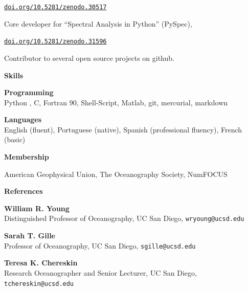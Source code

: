 \documentclass[a4paper,11pt,final]{memoir}
\newcommand{\Sep}{\vspace{1.25em}}
\newcommand{\SmallSep}{\vspace{0.5em}}
\newcommand{\CVSection}[1]
    {\Large\textbf{#1}\par
    \SmallSep\normalsize\normalfont}
\newcommand{\CVItem}[1]
    {\textbf{\color{NavyBlue} #1}}
\begin{document}
\href{http://dx.doi.org/10.5281/zenodo.30517}{\texttt{doi.org/10.5281/zenodo.30517}}

\SmallSep

Core developer for ``Spectral Analysis in Python'' (PySpec),

\SmallSep

\href{http://dx.doi.org/10.5281/zenodo.31596}{\texttt{doi.org/10.5281/zenodo.31596}}

\SmallSep

Contributor to several open source projects on github.

\Sep


\Sep

\CVSection{Skills}

\CVItem{Programming}\\
Python , C, Fortran 90, Shell-Script, Matlab, git, mercurial, markdown

\SmallSep

\CVItem{Languages}\\
English (fluent), Portuguese (native), Spanish (professional fluency), French (basic)

\Sep

\CVSection{Membership}

 American Geophysical Union, The Oceanography Society, NumFOCUS

\Sep

%

\Sep

\CVSection{References}

\CVItem{William R. Young}\\
Distinguished Professor of Oceanography, UC San Diego, \texttt{wryoung@ucsd.edu}

\SmallSep

\CVItem{Sarah T. Gille}\\
Professor of Oceanography, UC San Diego, \texttt{sgille@ucsd.edu}

\SmallSep

\CVItem{Teresa K. Chereskin}\\
Research Oceanographer and Senior Lecturer, UC San Diego, \texttt{tchereskin@ucsd.edu}

\SmallSep
%


\end{document}
